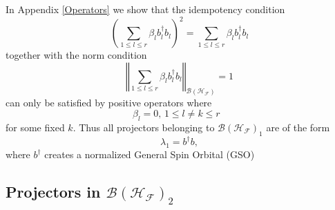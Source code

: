 \documentclass[aps,preprint]{revtex4}%
\begin{document}
In Appendix \ref{Operators} we show that the idempotency condition
\begin{equation}
\left(  \sum_{1\leq l\leq r}\beta_{l}b_{l}^{\dagger}b_{l}\right)  ^{2}%
=\sum_{1\leq l\leq r}\beta_{l}b_{l}^{\dagger}b_{l}%
\end{equation}
together with the norm condition
\begin{equation}
\left\Vert \sum_{1\leq l\leq r}\beta_{l}b_{l}^{\dagger}b_{l}\right\Vert
_{\mathcal{B}\left(  \mathcal{H}_{\mathcal{F}}\right)  }=1
\end{equation}
can only be satisfied by positive operators where
\begin{equation}
\beta_{l}=0,\,1\leq l\neq k\leq r\text{ }%
\end{equation}
for some fixed $k.$ Thus all projectors belonging to $\mathcal{B}\left(
\mathcal{H}_{\mathcal{F}}\right)  _{1}$ are of the form
\begin{equation}
\lambda_{1}=b^{\dagger}b,
\end{equation}
where $b^{\dagger}$ creates a normalized General Spin Orbital (GSO)

\subsection{Projectors in $\mathcal{B}\left(  \mathcal{H}_{\mathcal{F}%
}\right)  _{2}$ \label{Proj2}}
\end{document}
